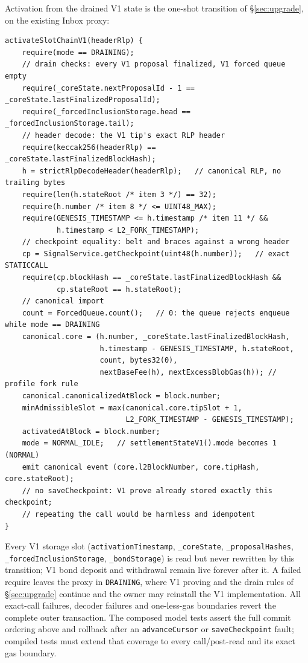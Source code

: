 \documentclass[a4paper,11pt]{article}
\newcommand{\code}[1]{\nolinkurl{#1}}
\begin{document}
Activation from the drained V1 state is the one-shot transition of
\S\ref{sec:upgrade}, on the existing Inbox proxy:
\begin{verbatim}
activateSlotChainV1(headerRlp) {
    require(mode == DRAINING);
    // drain checks: every V1 proposal finalized, V1 forced queue empty
    require(_coreState.nextProposalId - 1 == _coreState.lastFinalizedProposalId);
    require(_forcedInclusionStorage.head == _forcedInclusionStorage.tail);
    // header decode: the V1 tip's exact RLP header
    require(keccak256(headerRlp) == _coreState.lastFinalizedBlockHash);
    h = strictRlpDecodeHeader(headerRlp);   // canonical RLP, no trailing bytes
    require(len(h.stateRoot /* item 3 */) == 32);
    require(h.number /* item 8 */ <= UINT48_MAX);
    require(GENESIS_TIMESTAMP <= h.timestamp /* item 11 */ &&
            h.timestamp < L2_FORK_TIMESTAMP);
    // checkpoint equality: belt and braces against a wrong header
    cp = SignalService.getCheckpoint(uint48(h.number));   // exact STATICCALL
    require(cp.blockHash == _coreState.lastFinalizedBlockHash &&
            cp.stateRoot == h.stateRoot);
    // canonical import
    count = ForcedQueue.count();   // 0: the queue rejects enqueue while mode == DRAINING
    canonical.core = (h.number, _coreState.lastFinalizedBlockHash,
                      h.timestamp - GENESIS_TIMESTAMP, h.stateRoot,
                      count, bytes32(0),
                      nextBaseFee(h), nextExcessBlobGas(h)); // profile fork rule
    canonical.canonicalizedAtBlock = block.number;
    minAdmissibleSlot = max(canonical.core.tipSlot + 1,
                            L2_FORK_TIMESTAMP - GENESIS_TIMESTAMP);
    activatedAtBlock = block.number;
    mode = NORMAL_IDLE;   // settlementStateV1().mode becomes 1 (NORMAL)
    emit canonical event (core.l2BlockNumber, core.tipHash, core.stateRoot);
    // no saveCheckpoint: V1 prove already stored exactly this checkpoint;
    // repeating the call would be harmless and idempotent
}
\end{verbatim}
Every V1 storage slot (\code{activationTimestamp}, \code{_coreState},
\code{_proposalHashes}, \code{_forcedInclusionStorage}, \code{_bondStorage})
is read but never rewritten by this transition; V1 bond deposit and withdrawal
remain live forever after it.  A failed require leaves the proxy in
\code{DRAINING}, where V1 proving and the drain rules of \S\ref{sec:upgrade}
continue and the owner may reinstall the V1 implementation.  All exact-call
failures, decoder failures and one-less-gas boundaries revert the complete
outer transaction.  The composed model tests assert the full commit ordering
above and rollback after an \code{advanceCursor} or \code{saveCheckpoint}
fault; compiled tests must extend that coverage to every call/post-read and
its exact gas boundary.
\end{document}

